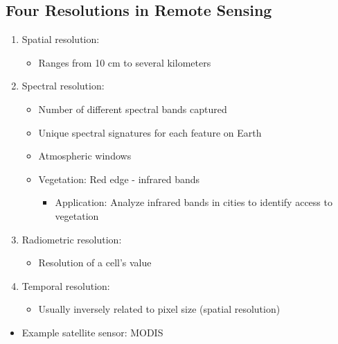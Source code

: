 \documentclass[
  letterpaper,
  DIV=11,
  numbers=noendperiod]{scrreprt}
\providecommand{\tightlist}{%
  \setlength{\itemsep}{0pt}\setlength{\parskip}{0pt}}\usepackage{longtable,booktabs,array}
\begin{document}
\hypertarget{four-resolutions-in-remote-sensing}{%
\subsection{\texorpdfstring{\textbf{Four Resolutions in Remote
Sensing}}{Four Resolutions in Remote Sensing}}\label{four-resolutions-in-remote-sensing}}

\begin{enumerate}
\def\labelenumi{\arabic{enumi}.}
\tightlist
\item
  Spatial resolution:

  \begin{itemize}
  \tightlist
  \item
    Ranges from 10 cm to several kilometers
  \end{itemize}
\item
  Spectral resolution:

  \begin{itemize}
  \tightlist
  \item
    Number of different spectral bands captured
  \item
    Unique spectral signatures for each feature on Earth
  \item
    Atmospheric windows
  \item
    Vegetation: Red edge - infrared bands

    \begin{itemize}
    \tightlist
    \item
      Application: Analyze infrared bands in cities to identify access
      to vegetation
    \end{itemize}
  \end{itemize}
\item
  Radiometric resolution:

  \begin{itemize}
  \tightlist
  \item
    Resolution of a cell's value
  \end{itemize}
\item
  Temporal resolution:

  \begin{itemize}
  \tightlist
  \item
    Usually inversely related to pixel size (spatial resolution)
  \end{itemize}
\end{enumerate}

\begin{itemize}
\tightlist
\item
  Example satellite sensor: MODIS
\end{itemize}
\end{document}
